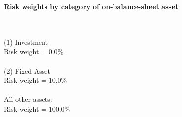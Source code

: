 \documentclass{article}
\begin{document}
\setlength{\parindent}{0em}
\begin{center}{\bf Risk weights by category of on-balance-sheet asset}\end{center}
~\\
~\\

(1) Investment\\
Risk weight = 0.0\%\\

~\\
(2) Fixed Asset\\
Risk weight = 10.0\%\\

~\\
All other assets:\\
Risk weight = 100.0\%\\

~\\
\end{document}
